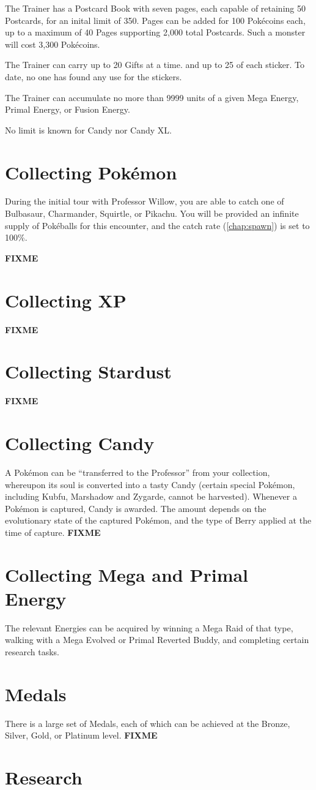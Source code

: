 The Trainer has a Postcard Book with seven pages, each capable of retaining
 50 Postcards, for an inital limit of 350.
Pages can be added for 100 Pokécoins each, up to a maximum of 40 Pages
 supporting 2,000 total Postcards.
Such a monster will cost 3,300 Pokécoins.

The Trainer can carry up to 20 Gifts at a time. and up to 25 of each sticker.
To date, no one has found any use for the stickers.

The Trainer can accumulate no more than 9999 units of a given Mega Energy,
 Primal Energy, or Fusion Energy.

No limit is known for Candy nor Candy XL.

\section{Collecting Pokémon}
During the initial tour with Professor Willow, you are able to catch one of
 Bulbasaur, Charmander, Squirtle, or Pikachu.
You will be provided an infinite supply of Pokéballs for this encounter, and
 the catch rate (\autoref{chap:spawn}) is set to 100\%.

\textbf{FIXME}

\section{Collecting XP}
\textbf{FIXME}

\section{Collecting Stardust}
\textbf{FIXME}

\section{Collecting Candy}
A Pokémon can be ``transferred to the Professor'' from your collection,
 whereupon its soul is converted into a tasty Candy (certain special
 Pokémon, including Kubfu, Marshadow and Zygarde, cannot be harvested).
Whenever a Pokémon is captured, Candy is awarded. The amount depends on
 the evolutionary state of the captured Pokémon, and the type of Berry
 applied at the time of capture.
\textbf{FIXME}

\section{Collecting Mega and Primal Energy}
The relevant Energies can be acquired by winning a Mega Raid of that type,
  walking with a Mega Evolved or Primal Reverted Buddy, and completing
  certain research tasks.

\section{Medals}
There is a large set of Medals, each of which can be achieved at the Bronze,
 Silver, Gold, or Platinum level.
\textbf{FIXME}

\section{Research}
\label{sec:research}
